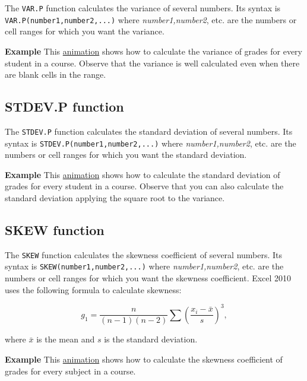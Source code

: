 The \texttt{VAR.P} function calculates the variance of several numbers. Its syntax is \texttt{VAR.P(number1,number2,...)} where \emph{number1,number2}, etc. are the numbers or cell ranges for which you want the variance.

\textbf{Example} This \href{http://aprendeconalf.es/office/excel/manual/img/example_function_varp.gif}{animation} shows how to calculate the variance of grades for every student in a course. Observe that the variance is well calculated even when there are blank cells in the range.

\subsection{STDEV.P function}\hypertarget{stdevp-function}{}\label{stdevp-function}

The \texttt{STDEV.P} function calculates the standard deviation of several numbers. Its syntax is \texttt{STDEV.P(number1,number2,...)} where \emph{number1,number2}, etc. are the numbers or cell ranges for which you want the standard deviation.

\textbf{Example} This \href{http://aprendeconalf.es/office/excel/manual/img/example_function_stdevp.gif}{animation} shows how to calculate the standard deviation of grades for every student in a course. Observe that you can also calculate the standard deviation applying the square root to the variance.

\subsection{SKEW function}\hypertarget{skew-function}{}\label{skew-function}

The \texttt{SKEW} function calculates the skewness coefficient of several numbers. Its syntax is \texttt{SKEW(number1,number2,...)} where \emph{number1,number2}, etc. are the numbers or cell ranges for which you want the skewness coefficient. Excel 2010 uses the following formula to calculate skewness:

\begin{displaymath}
g_1=\frac{n}{(n-1)(n-2)}\sum \left(\frac{x_i-\bar x}{s}\right)^3,
\end{displaymath}

where $\bar x$ is the mean and $s$ is the standard deviation.

\textbf{Example} This \href{http://aprendeconalf.es/office/excel/manual/img/example_function_skew.gif}{animation} shows how to calculate the skewness coefficient of grades for every subject in a course.

